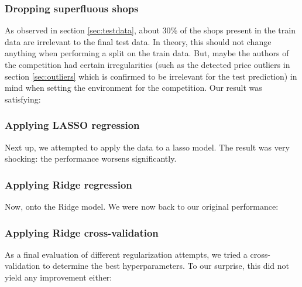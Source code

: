 \subsubsection{Dropping superfluous shops }

As observed in section \ref{sec:testdata}, about 30\% of the shops present in the train data are irrelevant to the final test data. In theory, this should not change anything when performing a split on the train data. But, maybe the authors of the competition had certain irregularities (such as the detected price outliers in section \ref{sec:outliers} which is confirmed to be irrelevant for the test prediction) in mind when setting the environment for the competition. Our result was satisfying:

\subsubsection{Applying LASSO regression }

Next up, we attempted to apply the data to a \acrshort{lasso} model. The result was very shocking: the performance worsens significantly.

\subsubsection{Applying Ridge regression }

Now, onto the Ridge model. We were now back to our original performance:


\subsubsection{Applying Ridge cross-validation }

As a final evaluation of different regularization attempts, we tried a cross-validation to determine the best \glspl{hyperparameter}. To our surprise, this did not yield any improvement either:

